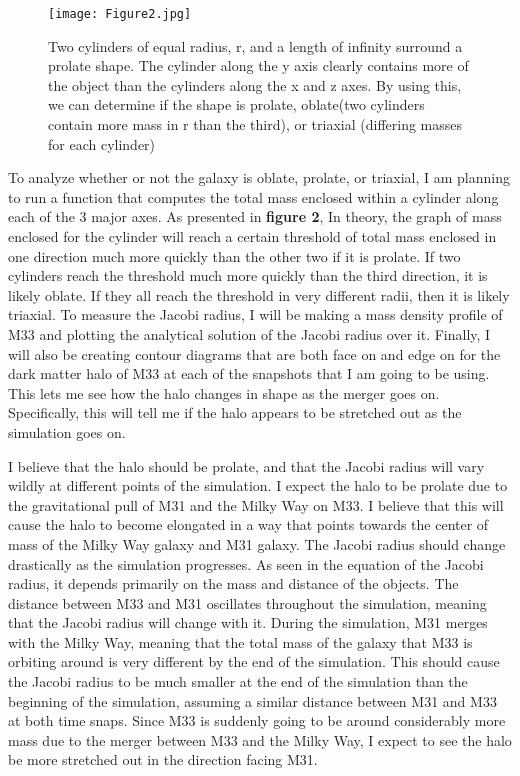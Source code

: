 \documentclass[fleqn,usenatbib]{mnras}
\begin{document}
\begin{figure}
                \centering
                \texttt{[image: Figure2.jpg]}
                \label{fig:enter-label}
            \caption{ Two cylinders of equal radius, r, and a length of infinity surround a prolate shape. The cylinder along the y axis clearly contains more of the object than the cylinders along the x and z axes. By using this, we can determine if the shape is prolate, oblate(two cylinders contain more mass in r than the third), or triaxial (differing masses for each cylinder)}
            \end{figure}
        To analyze whether or not the galaxy is oblate, prolate, or triaxial, I am planning to run a function that computes the total mass enclosed within a cylinder along each of the 3 major axes. As presented in \textbf{figure 2}, In theory, the graph of mass enclosed for the cylinder will reach a certain threshold of total mass enclosed in one direction much more quickly than the other two if it is prolate. If two cylinders reach the threshold much more quickly than the third direction, it is likely oblate. If they all reach the threshold in very different radii, then it is likely triaxial. To measure the Jacobi radius, I will be making a mass density profile of M33 and plotting the analytical solution of the Jacobi radius over it. Finally, I will also be creating contour diagrams that are both face on and edge on for the dark matter halo of M33 at each of the snapshots that I am going to be using. This lets me see how the halo changes in shape as the merger goes on. Specifically, this will tell me if the halo appears to be stretched out as the simulation goes on.

        I believe that the halo should be prolate, and that the Jacobi radius will vary wildly at different points of the simulation. I expect the halo to be prolate due to the gravitational pull of M31 and the Milky Way on M33. I believe that this will cause the halo to become elongated in a way that points towards the center of mass of the Milky Way galaxy and M31 galaxy. The Jacobi radius should change drastically as the simulation progresses. As seen in the equation of the Jacobi radius, it depends primarily on the mass and distance of the objects. The distance between M33 and M31 oscillates throughout the simulation, meaning that the Jacobi radius will change with it. During the simulation, M31 merges with the Milky Way, meaning that the total mass of the galaxy that M33 is orbiting around is very different by the end of the simulation. This should cause the Jacobi radius to be much smaller at the end of the simulation than the beginning of the simulation, assuming a similar distance between M31 and M33 at both time snaps. Since M33 is suddenly going to be around considerably more mass due to the merger between M33 and the Milky Way, I expect to see the halo be more stretched out in the direction facing M31.
\end{document}
